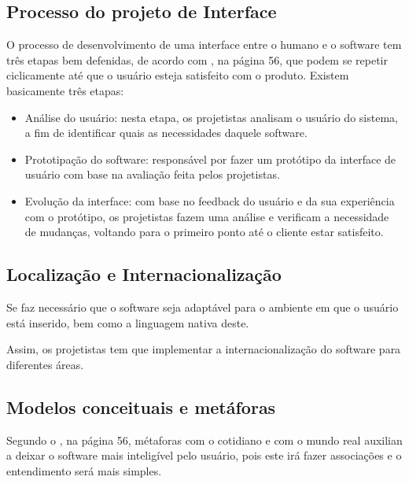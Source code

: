 \subsection{Processo do projeto de Interface}
\label{sub:Processo do projeto de Interface}

O processo de desenvolvimento de uma interface entre o humano e o software tem
três etapas bem defenidas, de acordo com \cite{swebok}, na página 56,
que podem se repetir
ciclicamente até que o usuário esteja satisfeito com o produto. Existem
basicamente três etapas:

\begin{itemize}
    \item Análise do usuário: nesta etapa, os projetistas analisam o usuário do
        sistema, a fim de identificar quais as necessidades daquele software.

    \item Prototipação do software: responsável por fazer um protótipo da
        interface de usuário com base na avaliação feita pelos projetistas.

    \item Evolução da interface: com base no feedback do usuário e da sua
        experiência com o protótipo, os projetistas fazem uma análise e verificam
        a necessidade de mudanças, voltando para o primeiro ponto até o cliente
        estar satisfeito.
\end{itemize}

\subsection{Localização e Internacionalização}
\label{sub:Localização e Internacionalização}

Se faz necessário que o software seja adaptável para o ambiente em que o usuário
está inserido, bem como a linguagem nativa deste.

Assim, os projetistas tem que implementar a internacionalização do software
para diferentes áreas.

\subsection{Modelos conceituais e metáforas}
\label{sub:Modelos conceituais e metáforas}

Segundo o \cite{swebok}, na página 56, métaforas com o cotidiano e com o mundo real auxilian a
deixar o software mais inteligível pelo usuário, pois este irá fazer associações
e o entendimento será mais simples.

